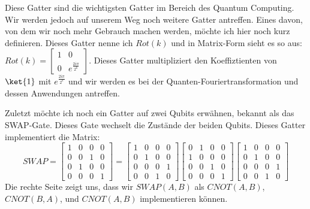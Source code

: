 Diese Gatter sind die wichtigsten Gatter im Bereich des Quantum Computing. Wir werden jedoch auf unserem Weg noch weitere Gatter antreffen. Eines davon, von dem wir noch mehr Gebrauch machen werden, möchte ich hier noch kurz definieren. Dieses Gatter nenne ich $Rot(k)$ und in Matrix-Form sieht es so aus: $Rot(k) = \begin{bmatrix}1 & 0 \\ 0 & e^{\frac{2i\pi}{2^k}}\end{bmatrix}$. Dieses Gatter multipliziert den Koeffiztienten von $\ket{1}$ mit $e^{\frac{2i\pi}{2^k}}$ und wir werden es bei der Quanten-Fouriertransformation und dessen Anwendungen antreffen.

Zuletzt möchte ich noch ein Gatter auf zwei Qubits erwähnen, bekannt als das SWAP-Gate. Dieses Gate wechselt die Zustände der beiden Qubits. Dieses Gatter implementiert die Matrix: $$ SWAP = \begin{bmatrix} 1 & 0 & 0 & 0 \\ 0 & 0 & 1 & 0 \\ 0 & 1 & 0 & 0 \\ 0 & 0 & 0 & 1 \end{bmatrix} = \begin{bmatrix}1 & 0 & 0 & 0 \\ 0 & 1 & 0 & 0 \\ 0 & 0 & 0 & 1 \\ 0 & 0 & 1 & 0\end{bmatrix} \begin{bmatrix}0 & 1 & 0 & 0 \\ 1 & 0 & 0 & 0 \\ 0 & 0 & 1 & 0 \\ 0 & 0 & 0 & 1 \end{bmatrix} \begin{bmatrix}1 & 0 & 0 & 0 \\ 0 & 1 & 0 & 0 \\ 0 & 0 & 0 & 1 \\ 0 & 0 & 1 & 0\end{bmatrix}$$
Die rechte Seite zeigt uns, dass wir $SWAP(A, B)$ als $CNOT(A, B)$, $CNOT(B, A)$, und $CNOT(A, B)$ implementieren können.